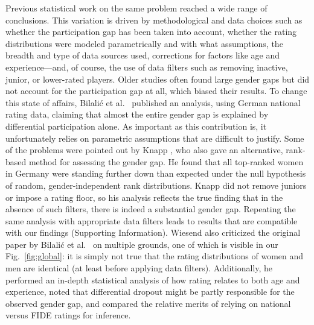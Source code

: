\documentclass[9pt,twocolumn,twoside,lineno]{pnas-new}
\newcommand{\SI}{Supporting Information}
\begin{document}
Previous statistical work on the same problem reached a wide range of conclusions. This variation is driven by methodological and data choices such as whether the participation gap has been taken into account, whether the rating distributions were modeled parametrically and with what assumptions, the breadth and type of data sources used, corrections for factors like age and experience---and, of course, the use of data filters such as removing inactive, junior, or lower-rated players. Older studies \cite{howard2005} often found large gender gaps but did not account for the participation gap at all, which biased their results. To change this state of affairs, Bilali\'c et al.~\cite{bilalic2009best} published an analysis, using German national rating data, claiming that almost the entire gender gap is explained by differential participation alone. As important as this contribution is, it unfortunately relies on parametric assumptions that are difficult to justify. Some of the problems were pointed out by Knapp \cite{knapp2010prsb}, who also gave an alternative, rank-based method for assessing the gender gap. He found that all top-ranked women in Germany were standing further down than expected under the null hypothesis of random, gender-independent rank distributions. Knapp did not remove juniors or impose a rating floor, so his analysis reflects the true finding that in the absence of such filters, there is indeed a substantial gender gap. Repeating the same analysis with appropriate data filters leads to results that are compatible with our findings (\SI). Wiesend \cite{wiesend2019questioning} also criticized the original paper by Bilali\'c et al.~\cite{bilalic2009best} on multiple grounds, one of which is visible in our Fig.~\ref{fig:global}: it is simply not true that the rating distributions of women and men are identical (at least before applying data filters). Additionally, he performed an in-depth statistical analysis of how rating relates to both age and experience, noted that differential dropout might be partly responsible for the observed gender gap, and compared the relative merits of relying on national versus FIDE ratings for inference.
\end{document}
